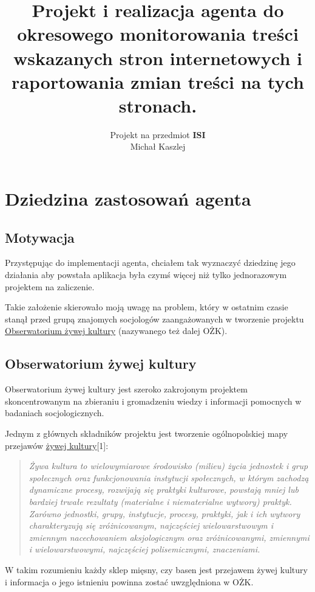 \documentclass[a4 122pt]{article}
\title{Projekt i realizacja agenta do okresowego monitorowania treści wskazanych stron internetowych i raportowania zmian treści na tych stronach.}
\author{Projekt na przedmiot \textbf{ISI}\\Michał Kaszlej}
\begin{document}
\maketitle

	\section{Dziedzina zastosowań agenta}

		\subsection{Motywacja}
		
			Przystępując do implementacji agenta, chciałem tak wyznaczyć dziedzinę jego działania aby powstała aplikacja była czymś więcej niż tylko jednorazowym projektem na zaliczenie.
			
			Takie założenie skierowało moją uwagę na problem, który w ostatnim czasie stanął przed grupą znajomych socjologów zaangażowanych w tworzenie projektu 
			\href{http://ozkultura.pl}{Obserwatorium żywej kultury} (nazywanego też dalej OŻK).

		\subsection{Obserwatorium żywej kultury}
		
			Obserwatorium żywej kultury jest szeroko zakrojonym projektem skoncentrowanym na zbieraniu i gromadzeniu wiedzy i informacji pomocnych w badaniach socjologicznych.
			
			Jednym z głównych składników projektu jest tworzenie ogólnopolskiej mapy przejawów \href{http://ozkultura.pl/node/111}{żywej kultury}[1]:
			
			\begin{quote}
				\textit{Żywa kultura to wielowymiarowe środowisko (milieu) życia jednostek i grup społecznych oraz funkcjonowania instytucji społecznych, w którym zachodzą dynamiczne procesy, rozwijają się praktyki kulturowe, powstają  mniej lub bardziej trwałe rezultaty (materialne i niematerialne wytwory) praktyk. Zarówno jednostki, grupy, instytucje, procesy, praktyki, jak i ich wytwory charakteryzują się zróżnicowanym, najczęściej wielowarstwowym i zmiennym  nacechowaniem aksjologicznym oraz zróżnicowanymi, zmiennymi i wielowarstwowymi, najczęściej polisemicznymi, znaczeniami.}
			\end{quote}
			
			W takim rozumieniu każdy sklep mięsny, czy basen jest przejawem żywej kultury i informacja o jego istnieniu powinna zostać uwzględniona w OŻK.
			
\end{document}
